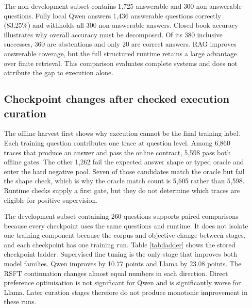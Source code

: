 The non-development subset contains 1,725 answerable and 300 non-answerable questions.  Fully local
Qwen answers 1,436 answerable questions correctly (83.25\%) and withholds all 300 non-answerable
answers.  Closed-book accuracy illustrates why overall accuracy must be decomposed.  Of its 380
inclusive successes, 360 are abstentions and only 20 are correct answers.  RAG improves answerable
coverage, but the full structured runtime retains a large advantage over finite retrieval.  This
comparison evaluates complete systems and does not attribute the gap to execution alone.

\subsection{Checkpoint changes after checked execution curation}

The offline harvest first shows why execution cannot be the final training label.  Each training
question contributes one trace at question level.  Among 6,860 traces that produce an answer and pass the
online contract, 5,598 pass both offline gates.  The
other 1,262 fail the expected answer shape or typed oracle and enter the hard negative pool.  Seven
of those candidates match the oracle but fail the shape check, which is why the oracle match count
is 5,605 rather than 5,598.  Runtime checks supply a first gate, but they do not determine which
traces are eligible for positive supervision.

The development subset containing 260 questions supports paired comparisons because every checkpoint uses the same
questions and runtime.  It does not isolate one training component because the corpus and objective
change between stages, and each checkpoint has one training run.  Table \ref{tab:ladder} shows the
stored checkpoint ladder.  Supervised fine tuning is the only stage that improves both model
families.  Qwen improves by 10.77 points and Llama by 23.08 points.  The RSFT continuation
changes almost equal numbers in each direction.  Direct preference optimisation is not significant
for Qwen and is significantly worse for Llama.  Later curation stages therefore do not produce
monotonic improvement in these runs.

